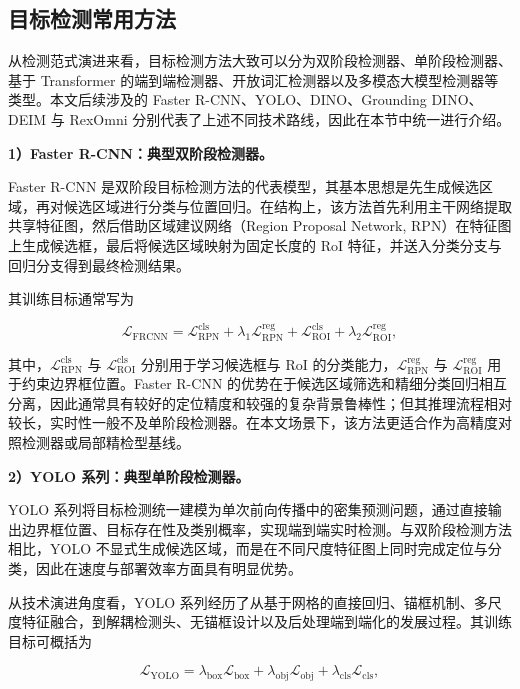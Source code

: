 \subsection{目标检测常用方法}

从检测范式演进来看，目标检测方法大致可以分为双阶段检测器、单阶段检测器、基于 Transformer 的端到端检测器、开放词汇检测器以及多模态大模型检测器等类型。本文后续涉及的 Faster R-CNN、YOLO、DINO、Grounding DINO、DEIM 与 RexOmni 分别代表了上述不同技术路线，因此在本节中统一进行介绍。

\noindent\textbf{1）Faster R-CNN：典型双阶段检测器。}

Faster R-CNN 是双阶段目标检测方法的代表模型，其基本思想是先生成候选区域，再对候选区域进行分类与位置回归\cite{ren2015faster}。在结构上，该方法首先利用主干网络提取共享特征图，然后借助区域建议网络（Region Proposal Network, RPN）在特征图上生成候选框，最后将候选区域映射为固定长度的 RoI 特征，并送入分类分支与回归分支得到最终检测结果。

其训练目标通常写为

\begin{equation}
\mathcal{L}_{\text{FRCNN}}=\mathcal{L}_{\text{RPN}}^{\text{cls}}+\lambda_1\mathcal{L}_{\text{RPN}}^{\text{reg}}+\mathcal{L}_{\text{ROI}}^{\text{cls}}+\lambda_2\mathcal{L}_{\text{ROI}}^{\text{reg}},
\end{equation}

其中，$\mathcal{L}_{\text{RPN}}^{\text{cls}}$ 与 $\mathcal{L}_{\text{ROI}}^{\text{cls}}$ 分别用于学习候选框与 RoI 的分类能力，$\mathcal{L}_{\text{RPN}}^{\text{reg}}$ 与 $\mathcal{L}_{\text{ROI}}^{\text{reg}}$ 用于约束边界框位置。Faster R-CNN 的优势在于候选区域筛选和精细分类回归相互分离，因此通常具有较好的定位精度和较强的复杂背景鲁棒性；但其推理流程相对较长，实时性一般不及单阶段检测器。在本文场景下，该方法更适合作为高精度对照检测器或局部精检型基线。

\noindent\textbf{2）YOLO 系列：典型单阶段检测器。}

YOLO 系列将目标检测统一建模为单次前向传播中的密集预测问题，通过直接输出边界框位置、目标存在性及类别概率，实现端到端实时检测\cite{redmon2016yolo,yolov10}。与双阶段检测方法相比，YOLO 不显式生成候选区域，而是在不同尺度特征图上同时完成定位与分类，因此在速度与部署效率方面具有明显优势。

从技术演进角度看，YOLO 系列经历了从基于网格的直接回归、锚框机制、多尺度特征融合，到解耦检测头、无锚框设计以及后处理端到端化的发展过程。其训练目标可概括为

\begin{equation}
\mathcal{L}_{\text{YOLO}}=\lambda_{\text{box}}\mathcal{L}_{\text{box}}+\lambda_{\text{obj}}\mathcal{L}_{\text{obj}}+\lambda_{\text{cls}}\mathcal{L}_{\text{cls}},
\end{equation}

